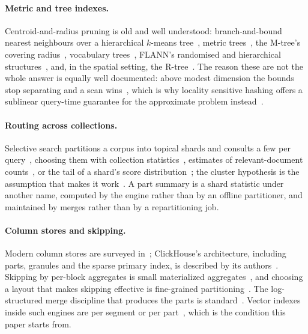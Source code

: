 \paragraph{Metric and tree indexes.}
Centroid-and-radius pruning is old and well understood: branch-and-bound
nearest neighbours over a hierarchical $k$-means
tree~\cite{fukunaga1975branch}, metric trees~\cite{uhlmann1991metric}, the
M-tree's covering radius~\cite{ciaccia1997mtree}, vocabulary
trees~\cite{nister2006vocabtree}, FLANN's randomised and hierarchical
structures~\cite{muja2014flann}, and, in the spatial setting, the
R-tree~\cite{guttman1984rtree}. The reason these are not the whole answer is
equally well documented: above modest dimension the bounds stop separating and
a scan wins~\cite{weber1998quantitative,beyer1999nn}, which is why locality
sensitive hashing offers a sublinear query-time guarantee for the approximate
problem instead~\cite{indyk1998lsh}.

\paragraph{Routing across collections.}
Selective search partitions a corpus into topical shards and consults a few per
query~\cite{kulkarni2015selective}, choosing them with collection
statistics~\cite{callan1995cori}, estimates of relevant-document
counts~\cite{si2003redde}, or the tail of a shard's score
distribution~\cite{aly2013taily}; the cluster hypothesis is the assumption that
makes it work~\cite{vanrijsbergen1979ir}. A part summary is a shard statistic
under another name, computed by the engine rather than by an offline
partitioner, and maintained by merges rather than by a repartitioning job.

\paragraph{Column stores and skipping.}
Modern column stores are surveyed in~\cite{abadi2013columnstores}; ClickHouse's
architecture, including parts, granules and the sparse primary index, is
described by its authors~\cite{schulze2024clickhouse,clickhousedocs}. Skipping
by per-block aggregates is small materialized
aggregates~\cite{moerkotte1998sma}, and choosing a layout that makes skipping
effective is fine-grained partitioning~\cite{sun2014skipping}. The
log-structured merge discipline that produces the parts is
standard~\cite{oneil1996lsm}. Vector indexes inside such engines are per
segment or per part~\cite{lucene,wang2021milvus,usearch}, which is the
condition this paper starts from.

